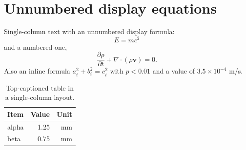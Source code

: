 \documentclass[11pt,a4paper]{article}
\begin{document}
\section{Unnumbered display equations}

Single-column text with an unnumbered display formula:
\[
E = m c^{2}
\]
and a numbered one,
\begin{equation}
\frac{\partial \rho}{\partial t} + \nabla \cdot (\rho \mathbf{v}) = 0 .
\end{equation}
Also an inline formula $a_{i}^{2} + b_{i}^{2} = c_{i}^{2}$ with $p < 0.01$ and a value of
$3.5 \times 10^{-4}$ m/s.

\begin{table}[h]
\centering
\caption{Top-captioned table in a single-column layout.}
\begin{tabular}{@{}lrr@{}}
\toprule
Item & Value & Unit \\
\midrule
alpha & 1.25 & mm \\
beta  & 0.75 & mm \\
\bottomrule
\end{tabular}
\end{table}
\end{document}
